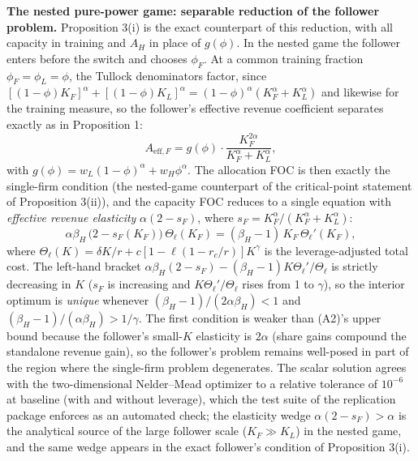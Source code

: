 \documentclass[
  11pt,
  letterpaper,
]{scrartcl}
\begin{document}
\textbf{The nested pure-power game: separable reduction of the follower
problem.} Proposition 3(i) is the exact counterpart of this reduction,
with all capacity in training and \(A_H\) in place of \(g(\phi)\). In
the nested game the follower enters before the switch and chooses
\(\phi_F\). At a common training fraction \(\phi_F = \phi_L = \phi\),
the Tullock denominators factor, since
\([(1-\phi)K_F]^\alpha + [(1-\phi)K_L]^\alpha = (1-\phi)^\alpha (K_F^\alpha + K_L^\alpha)\)
and likewise for the training measure, so the follower's effective
revenue coefficient separates exactly as in Proposition 1: \[
A_{\text{eff},F} = g(\phi) \cdot \frac{K_F^{2\alpha}}{K_F^\alpha + K_L^\alpha},
\] with \(g(\phi) = w_L (1-\phi)^\alpha + w_H \phi^\alpha\). The
allocation FOC is then exactly the single-firm condition (the
nested-game counterpart of the critical-point statement of Proposition
3(ii)), and the capacity FOC reduces to a single equation with
\emph{effective revenue elasticity} \(\alpha(2 - s_F)\), where
\(s_F = K_F^\alpha/(K_F^\alpha + K_L^\alpha)\): \[
\alpha \beta_H\,\bigl(2 - s_F(K_F)\bigr)\, \Theta_\ell(K_F) = (\beta_H - 1)\, K_F\, \Theta_\ell'(K_F),
\] where
\(\Theta_\ell(K) = \delta K / r + c[1 - \ell(1 - r_c/r)]K^\gamma\) is
the leverage-adjusted total cost. The left-hand bracket
\(\alpha\beta_H(2 - s_F) - (\beta_H - 1)K\Theta_\ell'/\Theta_\ell\) is
strictly decreasing in \(K\) (\(s_F\) is increasing and
\(K\Theta_\ell'/\Theta_\ell\) rises from 1 to \(\gamma\)), so the
interior optimum is \emph{unique} whenever
\((\beta_H - 1)/(2\alpha\beta_H) < 1\) and
\((\beta_H - 1)/(\alpha\beta_H) > 1/\gamma\). The first condition is
weaker than (A2)'s upper bound because the follower's small-\(K\)
elasticity is \(2\alpha\) (share gains compound the standalone revenue
gain), so the follower's problem remains well-posed in part of the
region where the single-firm problem degenerates. The scalar solution
agrees with the two-dimensional Nelder--Mead optimizer to a relative
tolerance of \(10^{-6}\) at baseline (with and without leverage), which
the test suite of the replication package enforces as an automated
check; the elasticity wedge \(\alpha(2 - s_F) > \alpha\) is the
analytical source of the large follower scale (\(K_F \gg K_L\)) in the
nested game, and the same wedge appears in the exact follower's
condition of Proposition 3(i).
\end{document}
